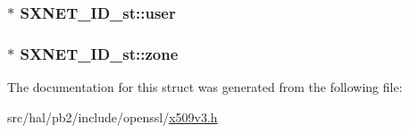 \subsubsection[{\texorpdfstring{user}{user}}]{$\ast$ S\+X\+N\+E\+T\+\_\+\+I\+D\+\_\+st\+::user}\hypertarget{struct_s_x_n_e_t___i_d__st_aa72978d5a59bbe0df0bb2d5190c30348}{}\label{struct_s_x_n_e_t___i_d__st_aa72978d5a59bbe0df0bb2d5190c30348}
\subsubsection[{\texorpdfstring{zone}{zone}}]{$\ast$ S\+X\+N\+E\+T\+\_\+\+I\+D\+\_\+st\+::zone}\hypertarget{struct_s_x_n_e_t___i_d__st_a37185a622f9b0cb3e0384652be7b9215}{}\label{struct_s_x_n_e_t___i_d__st_a37185a622f9b0cb3e0384652be7b9215}


The documentation for this struct was generated from the following file\+:\begin{DoxyCompactItemize}
\item 
src/hal/pb2/include/openssl/\hyperlink{x509v3_8h}{x509v3.\+h}\end{DoxyCompactItemize}
